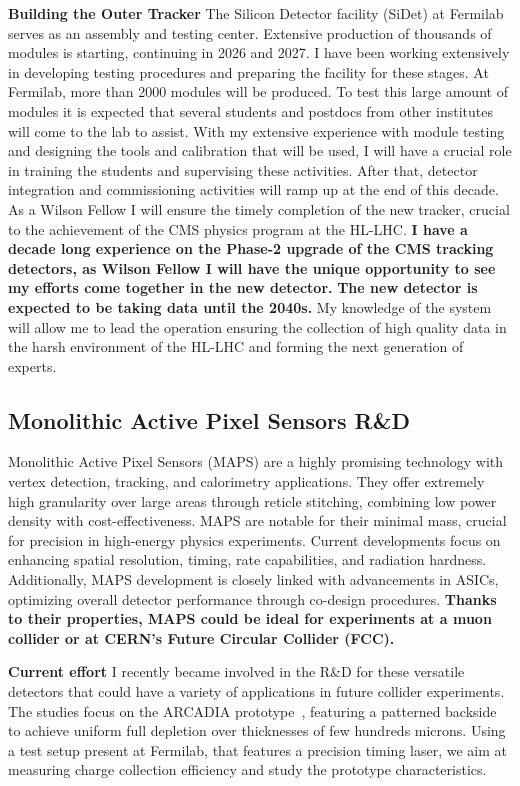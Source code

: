 {\begin{flushleft}
\textbf{Building the Outer Tracker}
The Silicon Detector facility (SiDet) at Fermilab serves as an assembly and testing center. Extensive production of thousands of modules is starting, continuing in 2026 and 2027. I have been working extensively in developing testing procedures and preparing the facility for these stages. At Fermilab, more than 2000 modules will be produced. To test this large amount of modules it is expected that several students and postdocs from other institutes will come to the lab to assist. With my extensive experience with module testing and designing the tools and calibration that will be used, I will have a crucial role in training the students and supervising these activities. 
After that, detector integration and commissioning activities will ramp up at the end of this decade. As a Wilson Fellow I will ensure the timely completion of the new tracker, crucial to the  achievement of the CMS physics program at the HL-LHC.
\textbf{I have a decade long experience on the Phase-2 upgrade of the CMS tracking detectors, as Wilson Fellow I will have the unique opportunity to see my efforts come together in the new detector.} 
{\bf The new detector is expected to be taking data until the 2040s.} My knowledge of the system will allow me to lead the operation ensuring the collection of high quality data in the harsh environment of the HL-LHC and forming the next generation of experts.

\vskip 10pt 
\subsection{Monolithic Active Pixel Sensors R\&D}
Monolithic Active Pixel Sensors (MAPS) are a highly promising technology with vertex detection, tracking, and calorimetry applications. They offer extremely high granularity over large areas through reticle stitching, combining low power density with cost-effectiveness. MAPS are notable for their minimal mass, crucial for precision in high-energy physics experiments.
Current developments focus on enhancing spatial resolution, timing, rate capabilities, and radiation hardness. Additionally, MAPS development is closely linked with advancements in ASICs, optimizing overall detector performance through co-design procedures. {\bf Thanks to their properties, MAPS could be ideal for experiments at a muon collider or at CERN's Future Circular Collider (FCC).}

\textbf{Current effort}
I recently became involved in the R\&D for these versatile detectors that could have a variety of applications in future collider experiments. The studies focus on the ARCADIA prototype~\cite{[7]}, featuring a patterned backside to achieve uniform full depletion over thicknesses of few hundreds microns. Using a test setup present at Fermilab, that features a precision timing laser, we aim at measuring charge collection efficiency and study the prototype characteristics.


\end{flushleft}}
